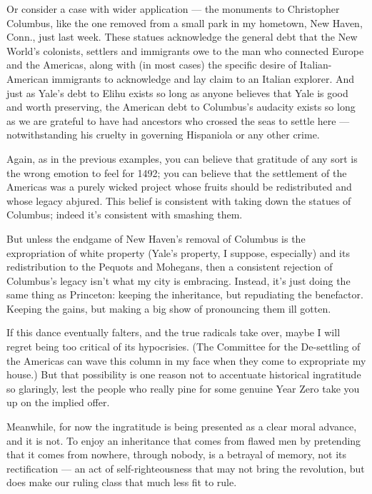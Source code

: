 Or consider a case with wider application --- the monuments to
Christopher Columbus, like the one removed from a small park in my
hometown, New Haven, Conn., just last week. These statues acknowledge
the general debt that the New World's colonists, settlers and immigrants
owe to the man who connected Europe and the Americas, along with (in
most cases) the specific desire of Italian-American immigrants to
acknowledge and lay claim to an Italian explorer. And just as Yale's
debt to Elihu exists so long as anyone believes that Yale is good and
worth preserving, the American debt to Columbus's audacity exists so
long as we are grateful to have had ancestors who crossed the seas to
settle here --- notwithstanding his cruelty in governing Hispaniola or
any other crime.

Again, as in the previous examples, you can believe that gratitude of
any sort is the wrong emotion to feel for 1492; you can believe that the
settlement of the Americas was a purely wicked project whose fruits
should be redistributed and whose legacy abjured. This belief is
consistent with taking down the statues of Columbus; indeed it's
consistent with smashing them.

But unless the endgame of New Haven's removal of Columbus is the
expropriation of white property (Yale's property, I suppose, especially)
and its redistribution to the Pequots and Mohegans, then a consistent
rejection of Columbus's legacy isn't what my city is embracing. Instead,
it's just doing the same thing as Princeton: keeping the inheritance,
but repudiating the benefactor. Keeping the gains, but making a big show
of pronouncing them ill gotten.

If this dance eventually falters, and the true radicals take over, maybe
I will regret being too critical of its hypocrisies. (The Committee for
the De-settling of the Americas can wave this column in my face when
they come to expropriate my house.) But that possibility is one reason
not to accentuate historical ingratitude so glaringly, lest the people
who really pine for some genuine Year Zero take you up on the implied
offer.

Meanwhile, for now the ingratitude is being presented as a clear moral
advance, and it is not. To enjoy an inheritance that comes from flawed
men by pretending that it comes from nowhere, through nobody, is a
betrayal of memory, not its rectification --- an act of
self-righteousness that may not bring the revolution, but does make our
ruling class that much less fit to rule.

